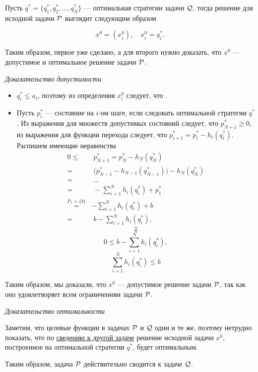 Пусть $q^* = \{q_1^*, q_2^*, \dots, q_N^*\}$ --- оптимальная стратегии задачи $\Q$, тогда решение для исходной задачи $\P$ выглядит следующим образом

\[
x^0 = (x_i^0), \quad x_i^0 = q_i^*.
\]

Таким образом, первое уже сделано, а для второго нужно доказать, что $x^0$ --- допустимое и оптимальное решение задачи $\P$.

\bigskip

\textit{Доказательство допустимости}

\begin{itemize}[nosep]
	\item $q_i^* \le a_i$, поэтому из определения $x_i^0$ следует, что .
		
	\item Пусть $p_i^*$ --- состояние на $i$-ом шаге, если следовать оптимальной стратегии $q^*$.  Из выражения для множеств допустимых состояний следует, что $p_{N+1}^* \ge 0$, из выражения для функции перехода следует, что $p_{i+1}^* = p_i^* - h_i (q_i^*)$. Распишем имеющие неравенства
	\begin{align*}
		0 \le& \; p_{N+1}^* = p_N^* - h_N (q_N^*) \\
		=& \; \big(p_{N-1}^* - h_{N-1}(q_{N-1}^*)\big) - h_N (q_N^*) \\
		=& \; \dots \\
		=& \; -\sum_{i=1}^N h_i(q_i^*) + p_1^* \\
		\stackrel{P_1=\{b\}}{=}& -\sum_{i=1}^N h_i(q_i^*) + b \\
		=& \; b - \sum_{i=1}^N h_i(q_i^*),
	\end{align*}
	\[
	\Downarrow
	\]
	\[0 \le b - \sum_{i=1}^N h_i(q_i^*),\]
	\[\boxed{\sum_{i=1}^N h_i(q_i^*) \le b}\]
\end{itemize}

Таким образом, мы доказали, что $x^0$ --- допустимое решение задачи $\P$, так как оно удовлетворяет всем ограничениям задачи $\P$.

\bigskip

\textit{Доказательство оптимальности}

Заметим, что целевые функции в задачах $\P$ и $\Q$ одни и те же, поэтому нетрудно показать, что по \hyperref[fact:reduction_to_other_problem]{сведению к другой задаче} решение исходной задачи $x^0$, построенное на оптимальной стратегии $q^*$, будет оптимальным.

Таким образом, задача $\P$ действительно сводится к задаче $\Q$.

